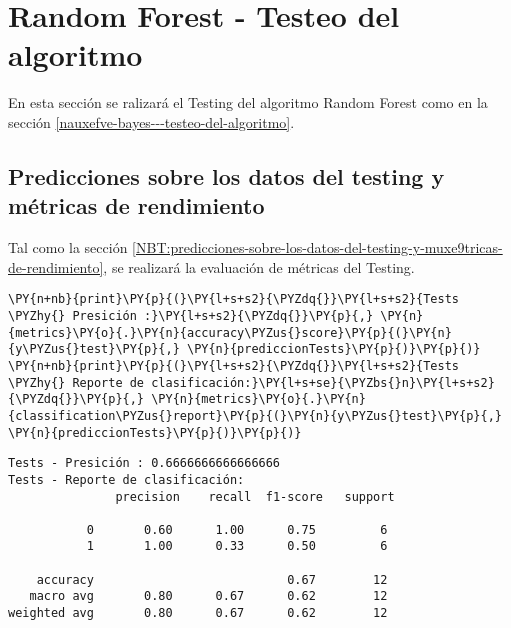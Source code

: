     \hypertarget{random-forest---testeo-del-algoritmo}{%
\section{Random Forest - Testeo del algoritmo}\label{random-forest---testeo-del-algoritmo}}

	En esta sección se ralizará el Testing del algoritmo Random Forest como en la sección \ref{nauxefve-bayes---testeo-del-algoritmo}.\\

    \hypertarget{predicciones-sobre-los-datos-del-testing-y-muxe9tricas-de-rendimiento}{%
\subsection{Predicciones sobre los datos del testing y métricas de rendimiento}\label{predicciones-sobre-los-datos-del-testing-y-muxe9tricas-de-rendimiento}}

	Tal como la sección \ref{NBT:predicciones-sobre-los-datos-del-testing-y-muxe9tricas-de-rendimiento}, se realizará la evaluación de métricas del Testing.\\

    \begin{tcolorbox}[breakable, size=fbox, boxrule=1pt, pad at break*=1mm,colback=cellbackground, colframe=cellborder]
\begin{Verbatim}[commandchars=\\\{\}]
\PY{n+nb}{print}\PY{p}{(}\PY{l+s+s2}{\PYZdq{}}\PY{l+s+s2}{Tests \PYZhy{} Presición :}\PY{l+s+s2}{\PYZdq{}}\PY{p}{,} \PY{n}{metrics}\PY{o}{.}\PY{n}{accuracy\PYZus{}score}\PY{p}{(}\PY{n}{y\PYZus{}test}\PY{p}{,} \PY{n}{prediccionTests}\PY{p}{)}\PY{p}{)}
\PY{n+nb}{print}\PY{p}{(}\PY{l+s+s2}{\PYZdq{}}\PY{l+s+s2}{Tests \PYZhy{} Reporte de clasificación:}\PY{l+s+se}{\PYZbs{}n}\PY{l+s+s2}{\PYZdq{}}\PY{p}{,} \PY{n}{metrics}\PY{o}{.}\PY{n}{classification\PYZus{}report}\PY{p}{(}\PY{n}{y\PYZus{}test}\PY{p}{,} \PY{n}{prediccionTests}\PY{p}{)}\PY{p}{)}
\end{Verbatim}
\end{tcolorbox}

    \begin{Verbatim}[commandchars=\\\{\}]
Tests - Presición : 0.6666666666666666
Tests - Reporte de clasificación:
               precision    recall  f1-score   support

           0       0.60      1.00      0.75         6
           1       1.00      0.33      0.50         6

    accuracy                           0.67        12
   macro avg       0.80      0.67      0.62        12
weighted avg       0.80      0.67      0.62        12

    \end{Verbatim}

